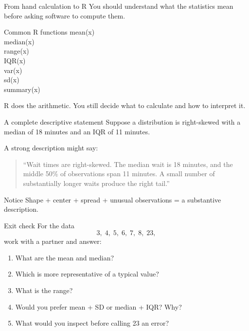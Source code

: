 \documentclass[11pt,aspectratio=169]{beamer}
\begin{document}
\begin{frame}{From hand calculation to R}
You should understand what the statistics mean before asking software to compute them.

\vspace{0.5em}
\begin{block}{Common R functions}
\ttfamily
mean(x)\\
median(x)\\
range(x)\\
IQR(x)\\
var(x)\\
sd(x)\\
summary(x)
\end{block}

\vfill
\alert{R does the arithmetic. You still decide what to calculate and how to interpret it.}
\end{frame}

\begin{frame}{A complete descriptive statement}
Suppose a distribution is right-skewed with a median of 18 minutes and an IQR of 11 minutes.

\vspace{0.8em}
A strong description might say:

\begin{quote}
``Wait times are right-skewed. The median wait is 18 minutes, and the middle 50\% of observations span 11 minutes. A small number of substantially longer waits produce the right tail.''
\end{quote}

\vfill
\begin{alertblock}{Notice}
Shape + center + spread + unusual observations = a substantive description.
\end{alertblock}
\end{frame}

\begin{frame}{Exit check}
For the data
\[
3,\;4,\;5,\;6,\;7,\;8,\;23,
\]
work with a partner and answer:

\begin{enumerate}
  \item What are the mean and median?
  \item Which is more representative of a typical value?
  \item What is the range?
  \item Would you prefer mean + SD or median + IQR? Why?
  \item What would you inspect before calling 23 an error?
\end{enumerate}
\end{frame}
\end{document}
